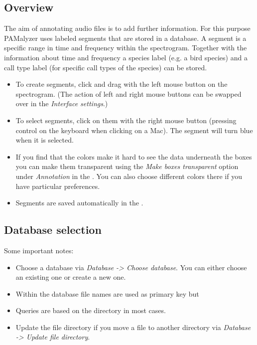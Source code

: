 \documentclass{scrartcl}
\begin{document}
\subsection{Overview}

The aim of annotating audio files is to add further information.
For this purpose PAMalyzer uses labeled segments that are stored in a database.
A segment is a specific range in time and frequency within the spectrogram.
Together with the information about time and frequency a species label (e.g. a bird species) and a call type label (for specific call types of the species) can be stored.

\begin{itemize}
	\item To create segments, click and drag with the left mouse button on the spectrogram.
		(The action of left and right mouse buttons can be swapped over in the \textit{Interface settings}.)
	\item To select segments, click on them with the right mouse button (pressing control on the keyboard when clicking on a Mac).
		The segment will turn blue when it is selected.
	\item If you find that the colors make it hard to see the data underneath the boxes you can make them transparent using the \textit{Make boxes transparent} option under \textit{Annotation} in the \textit{}.
		You can also choose different colors there if you have particular preferences.
	\item Segments are saved automatically in the .
\end{itemize}

\subsection{Database selection}\label{sec:database}
Some important notes:

\begin{itemize}
	\item Choose a database via \textit{Database -> Choose database}. 
		You can either choose an existing one or create a new one. 
	\item Within the database file names are used as primary key but
	\item Queries are based on the directory in most cases.
	\item Update the file directory if you move a file to another directory via \textit{Database -> Update file directory}.
\end{itemize}
\end{document}
